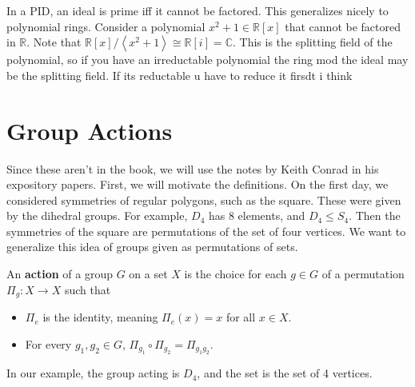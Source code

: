 
\begin{remark}
	In a PID, an ideal is prime iff it cannot be factored. This generalizes nicely to polynomial rings. Consider a polynomial $x^2+1\in \mathbb{R}[x]$ that cannot be factored in $\mathbb{R}$. Note that $\mathbb{R}[x] /\left\langle x^2+1 \right\rangle \cong \mathbb{R}[i]=\mathbb{C}$. This is the splitting field of the polynomial, so if you have an irreductable polynomial the ring mod the ideal may be the splitting field. If its reductable u have to reduce it firsdt i think
\end{remark}
\chapter{Group Actions}
Since these aren't in the book, we will use the notes by Keith Conrad in his expository papers. First, we will motivate the definitions. On the first day, we considered symmetries of regular polygons, such as the square. These were given by the dihedral groups. For example, $D_4$ has 8 elements, and $D_4\leq S_4$. Then the symmetries of the square are permutations of the set of four vertices. We want to generalize this idea of groups given as permutations of sets.

\begin{definition}\label{dfn:a}
	An \textbf{action} of a group $G$ on a set $X$ is the choice for each $g\in G$ of a permutation $\Pi_g : X \to X$ such that
	\begin{itemize}
		\item $\Pi_e$ is the identity, meaning $\Pi_e(x)=x$ for all $x\in X$.
		\item For every $g_1,g_2\in G$, $\Pi_{g_1}\circ \Pi_{g_2}=\Pi_{g_1g_2}$.
	\end{itemize}
\end{definition}

In our example, the group acting is $D_4$, and the set is the set of 4 vertices.
